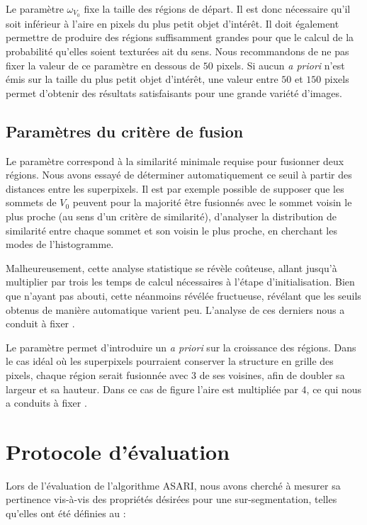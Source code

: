 Le paramètre $\omega_{V_{0}}$ fixe la taille des régions de départ. Il est donc nécessaire qu'il soit inférieur à l'aire en pixels du plus petit objet d'intérêt. Il doit également permettre de produire des régions suffisamment grandes pour que le calcul de la probabilité qu'elles soient texturées ait du sens. Nous recommandons de ne pas fixer la valeur de ce paramètre en dessous de $50$ pixels. Si aucun \textit{a priori} n'est émis sur la taille du plus petit objet d'intérêt, une valeur entre $50$ et $150$ pixels permet d'obtenir des résultats satisfaisants pour une grande variété d'images. 

\subsection{Paramètres du critère de fusion}

Le paramètre  correspond à la similarité minimale requise pour fusionner deux régions. Nous avons essayé de déterminer automatiquement ce seuil à partir des distances entre les superpixels. Il est par exemple possible de supposer que les sommets de $V_{0}$ peuvent\modif{,} pour la majorité\modif{,} être fusionnés avec le sommet voisin le plus proche (au sens d'un critère de similarité), d'analyser la distribution  de similarité entre chaque sommet et son voisin le plus proche, en cherchant les modes de l'histogramme. 

Malheureusement, cette analyse statistique se révèle coûteuse, allant jusqu'à multiplier par trois les temps de calcul nécessaires à l'étape d'initialisation. Bien que n'ayant pas abouti, cette  néanmoins révélée fructueuse, révélant que les seuils obtenus de manière automatique varient peu. L'analyse de ces derniers nous a conduit à fixer .

Le paramètre  permet d'introduire un \textit{a priori} sur la croissance des régions. Dans le cas idéal où les superpixels pourraient conserver la structure en grille des pixels, chaque région serait fusionnée avec $3$ de ses voisines, afin de doubler sa largeur et sa hauteur. Dans ce cas de figure l'aire est multipliée par $4$, ce qui nous a  conduits à fixer .

\section{Protocole d'évaluation}
\label{sec:res}
Lors de  l'évaluation de l'algorithme ASARI, nous avons cherché à mesurer sa pertinence vis-à-vis des propriétés désirées pour une sur-segmentation, telles qu'elles ont été définies au  :

